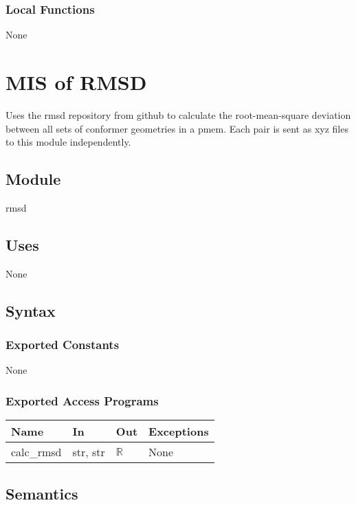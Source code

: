 \documentclass[12pt, titlepage]{article}
\begin{document}
\subsubsection{Local Functions}

None

\section{MIS of RMSD} \label{section-rmsd}

Uses the rmsd repository from github to calculate the root-mean-square 
deviation between all sets of conformer geometries in a pmem. Each pair is sent 
as xyz files to this module independently.

\subsection{Module}

rmsd

\subsection{Uses}

None

\subsection{Syntax}

\subsubsection{Exported Constants}

None

\subsubsection{Exported Access Programs}

\begin{center}
	\begin{tabular}{p{2cm} p{4cm} p{4cm} p{2cm}}
		\hline
		\textbf{Name} & \textbf{In} & \textbf{Out} & \textbf{Exceptions} \\
		\hline
		calc\_rmsd & str, str & $\mathbb{R}$ & None \\
		\hline
	\end{tabular}
\end{center}

\subsection{Semantics}
\end{document}
